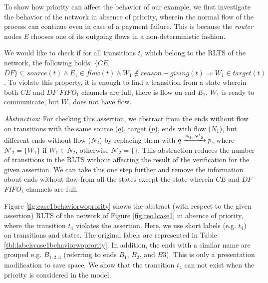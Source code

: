 To show how priority can affect the behavior of our example, we first investigate the behavior of the network in absence of priority, wherein the normal flow of the process can continue even in case of a payment failure. This is because the \emph{router} nodes \emph{E} chooses one of its outgoing flows in a non-deterministic fashion. %

We would like to check if for all transitions $t$, which belong to the RLTS of the network, the following holds: $\{CE,$ $ DF\} \subseteq source(t) \wedge E_1 \in flow(t) \wedge W_1 \notin reason-giving(t) \Rightarrow W_1 \in target(t)$. To violate this property, it is enough to find a transition from a state wherein both $CE$ and $DF$ \emph{FIFO}$_1$ channels are full, there is flow on end $E_1$, $W_1$ is ready to communicate, but $W_1$ does not have flow.

\emph{Abstraction}: 
For checking this assertion, we abstract from the ends without flow on transitions with the same source ($q$), target ($p$), ends with flow ($N_1$), but different ends without flow ($N_2$) by replacing them with $q\xrightarrow{N_1, {N'}_2}p$, where ${N'}_2=\{W_1\}$ if $W_1 \in N_2$, otherwise ${N'}_2=\{\}$. This abstraction reduces the number of transitions in the RLTS without affecting the result of the verification for the given assertion. We can take this one step further and remove the information about ends without flow from all the states except the state wherein $CE$ and $DF$ \emph{FIFO}$_1$ channels are full.

Figure \ref{fig:case1behaviorwoprority} shows the abstract (with respect to the given assertion) RLTS of the network of Figure \ref{fig:reo1case1} in absence of priority, where the transition $t_4$ violates the assertion. Here, we use short labels (e.g. $t_4$) on transitions and states. The original labels are represented in Table \ref{tbl:labelscase1behaviorwoprority}. In addition, the ends with a similar name are grouped e.g. $B_{1,2,3}$ (referring to ends $B_1$, $B_2$, and $B3$). This is only a presentation modification to save space. We show that the transition $t_4$ can not exist when the priority is considered in the model.

